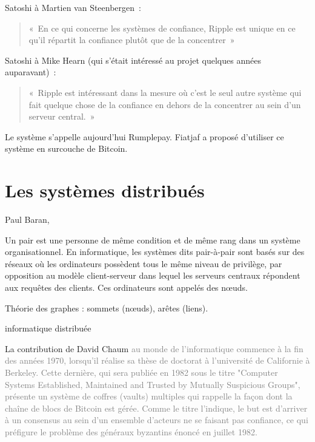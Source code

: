 Satoshi à Martien van Steenbergen~:

\begin{quote}
«~En ce qui concerne les systèmes de confiance, Ripple est unique en ce qu'il répartit la confiance plutôt que de la concentrer~»
\end{quote}

Satoshi à Mike Hearn (qui s'était intéressé au projet quelques années auparavant)~:

\begin{quote}
«~Ripple est intéressant dans la mesure où c'est le seul autre système qui fait quelque chose de la confiance en dehors de la concentrer au sein d'un serveur central.~»
\end{quote}

Le système s'appelle aujourd'hui Rumplepay. Fiatjaf a proposé d'utiliser ce système en surcouche de Bitcoin.

\section{Les systèmes distribués}

Paul Baran, 

Un pair est une personne de même condition et de même rang dans un système organisationnel. En informatique, les systèmes dits pair-à-pair sont basés sur des réseaux où les ordinateurs possèdent tous le même niveau de privilège, par opposition au modèle client-serveur dans lequel les serveurs centraux répondent aux requêtes des clients. Ces ordinateurs sont appelés des nœuds.

Théorie des graphes : sommets (nœuds), arêtes (liens).

informatique distribuée %

La contribution de David Chaum \textcolor{gray}{au monde de l'informatique commence à la fin des années 1970, lorsqu'il réalise sa thèse de doctorat à l'université de Californie à Berkeley. Cette dernière, qui sera publiée en 1982 sous le titre "Computer Systems Established, Maintained and Trusted by Mutually Suspicious Groups", présente un système de coffres (vaults) multiples qui rappelle la façon dont la chaîne de blocs de Bitcoin est gérée. Comme le titre l'indique, le but est d'arriver à un consensus au sein d'un ensemble d'acteurs ne se faisant pas confiance, ce qui préfigure le problème des généraux byzantins énoncé en juillet 1982.}

